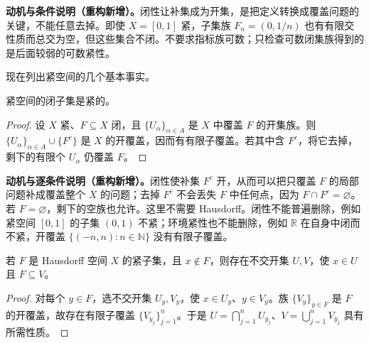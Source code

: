 \documentclass[../../main.tex]{subfiles}%
\begin{document}
\begin{remark}
\textbf{动机与条件说明（重构新增）。}闭性让补集成为开集，是把定义转换成覆盖问题的关键，不能任意去掉。即使 $X=[0,1]$ 紧，子集族 $F_n=(0,1/n)$ 也有有限交性质而总交为空，但这些集合不闭。不要求指标族可数；只检查可数闭集族得到的是后面较弱的可数紧性。
\end{remark}
现在列出紧空间的几个基本事实。
\begin{proposition}\label{proposition:ch04-closed-subset-compact}
紧空间的闭子集是紧的。
\end{proposition}
\begin{proof}
设 $X$ 紧、$F\subseteq X$ 闭，且 $\{U_\alpha\}_{\alpha\in A}$ 是 $X$ 中覆盖 $F$ 的开集族。则 $\{U_\alpha\}_{\alpha\in A}\cup\{F^c\}$ 是 $X$ 的开覆盖，因而有有限子覆盖。若其中含 $F^c$，将它去掉，剩下的有限个 $U_\alpha$ 仍覆盖 $F$。
\end{proof}
\begin{remark}
\textbf{动机与逐条件说明（重构新增）。}闭性使补集 $F^c$ 开，从而可以把只覆盖 $F$ 的局部问题补成覆盖整个 $X$ 的问题；去掉 $F^c$ 不会丢失 $F$ 中任何点，因为 $F\cap F^c=\varnothing$。若 $F=\varnothing$，剩下的空族也允许。这里不需要 Hausdorff。闭性不能普遍删除，例如紧空间 $[0,1]$ 的子集 $(0,1)$ 不紧；环境紧性也不能删除，例如 $\mathbb R$ 在自身中闭而不紧，开覆盖 $\{(-n,n):n\in\mathbb N\}$ 没有有限子覆盖。
\end{remark}
\begin{proposition}\label{proposition:ch04-point-compact-separation}
若 $F$ 是 Hausdorff 空间 $X$ 的紧子集，且 $x\notin F$，则存在不交开集 $U,V$，使 $x\in U$ 且 $F\subseteq V$。
\end{proposition}
\begin{proof}
对每个 $y\in F$，选不交开集 $U_y,V_y$，使 $x\in U_y$、$y\in V_y$。族 $\{V_y\}_{y\in F}$ 是 $F$ 的开覆盖，故存在有限子覆盖 $\{V_{y_j}\}_{j=1}^n$。于是 $U=\bigcap_{j=1}^nU_{y_j}$、$V=\bigcup_{j=1}^nV_{y_j}$ 具有所需性质。
\end{proof}
\end{document}

